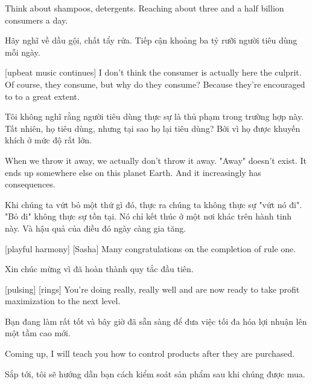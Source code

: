 \documentclass[a4paper]{article}
\begin{document}
	Think about shampoos, detergents. Reaching about three and a half billion consumers a day.
	
	\begin{vietnamese-v2}
		Hãy nghĩ về dầu gội, chất tẩy rửa. Tiếp cận khoảng ba tỷ rưỡi người tiêu dùng mỗi ngày.
	\end{vietnamese-v2}
	
	[upbeat music continues]
	I don't think the consumer is actually here the culprit.
	Of course, they consume, but why do they consume?
	Because they're encouraged to to a great extent.
	
	\begin{vietnamese-v2}
		 Tôi không nghĩ rằng người tiêu dùng thực sự là thủ phạm trong trường hợp này. 
		Tất nhiên, họ tiêu dùng, nhưng tại sao họ lại tiêu dùng? 
		Bởi vì họ được khuyến khích ở mức độ rất lớn.
	\end{vietnamese-v2}
	
	When we throw it away, we actually don't throw it away.
	"Away" doesn't exist.
	It ends up somewhere else on this planet Earth.
	And it increasingly has consequences.
	
	\begin{vietnamese-v2}
		Khi chúng ta vứt bỏ một thứ gì đó, thực ra chúng ta không thực sự "vứt nó đi". 
		"Bỏ đi" không thực sự tồn tại. 
		Nó chỉ kết thúc ở một nơi khác trên hành tinh này. 
		Và hậu quả của điều đó ngày càng gia tăng.
	\end{vietnamese-v2}
	
	[playful harmony]
	[Sasha] Many congratulations on the completion of rule one.
	
	\begin{vietnamese-v2}
		 Xin chúc mừng vì đã hoàn thành quy tắc đầu tiên.
	\end{vietnamese-v2}
	
	[pulsing]
	[rings]
	You're doing really, really well and are now ready to take profit maximization to the next level.
	
	\begin{vietnamese-v2}
		Bạn đang làm rất tốt và bây giờ đã sẵn sàng để đưa việc tối đa hóa lợi nhuận lên một tầm cao mới.
	\end{vietnamese-v2}
	
	Coming up, I will teach you how to control products after they are purchased.
	
	\begin{vietnamese-v2}
		Sắp tới, tôi sẽ hướng dẫn bạn cách kiểm soát sản phẩm sau khi chúng được mua.
	\end{vietnamese-v2}
	
\end{document}
